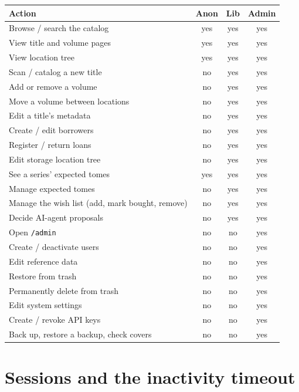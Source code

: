 \begin{longtable}{@{} l c c c @{}}
\toprule
\textbf{Action} & \textbf{Anon} & \textbf{Lib} & \textbf{Admin} \\
\midrule
\endhead
Browse / search the catalog        & yes & yes & yes \\
View title and volume pages        & yes & yes & yes \\
View location tree                 & yes & yes & yes \\
\midrule
Scan / catalog a new title         & no  & yes & yes \\
Add or remove a volume             & no  & yes & yes \\
Move a volume between locations    & no  & yes & yes \\
Edit a title's metadata            & no  & yes & yes \\
Create / edit borrowers            & no  & yes & yes \\
Register / return loans            & no  & yes & yes \\
Edit storage location tree         & no  & yes & yes \\
See a series' expected tomes       & yes & yes & yes \\
Manage expected tomes              & no  & yes & yes \\
Manage the wish list (add, mark bought, remove) & no & yes & yes \\
Decide AI-agent proposals          & no  & yes & yes \\
\midrule
Open \texttt{/admin}               & no  & no  & yes \\
Create / deactivate users          & no  & no  & yes \\
Edit reference data                & no  & no  & yes \\
Restore from trash                 & no  & no  & yes \\
Permanently delete from trash      & no  & no  & yes \\
Edit system settings               & no  & no  & yes \\
Create / revoke API keys           & no  & no  & yes \\
Back up, restore a backup, check covers & no & no & yes \\
\bottomrule
\end{longtable}

\section{Sessions and the inactivity timeout}

